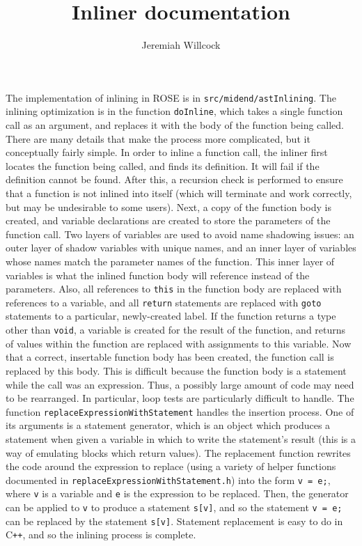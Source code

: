 \documentclass{article}
\begin{document}
\author{Jeremiah Willcock}
\title{Inliner documentation}
\maketitle

\lstset{language=C++}
\newcommand{\Cpp}{C\texttt{++}}

The implementation of inlining in ROSE is in
\texttt{src/midend/astInlining}.  The inlining optimization is in the
function \lstinline{doInline}, which takes a single function call as an
argument, and replaces it with the body of the function being called.
There are many details that make the process more complicated, but it
conceptually fairly simple.  In order to inline a function call, the
inliner first locates the function being called, and finds its definition.
It will fail if the definition cannot be found.  After this, a recursion
check is performed to ensure that a function is not inlined into itself
(which will terminate and work correctly, but may be undesirable to some
users).  Next, a copy of the function body is created, and variable
declarations are created to store the parameters of the function call.  Two
layers of variables are used to avoid name shadowing issues: an outer layer
of shadow variables with unique names, and an inner layer of variables
whose names match the parameter names of the function.  This inner layer of
variables is what the inlined function body will reference instead of the
parameters.  Also, all references to \lstinline{this} in the function body
are replaced with references to a variable, and all \lstinline{return}
statements are replaced with \lstinline{goto} statements to a particular,
newly-created label.  If the function returns a type other than
\lstinline{void}, a variable is created for the result of the function, and
returns of values within the function are replaced with assignments to this
variable.  Now that a correct, insertable function body has been created,
the function call is replaced by this body.  This is difficult because the
function body is a statement while the call was an expression.  Thus, a
possibly large amount of code may need to be rearranged.  In particular,
loop tests are particularly difficult to handle.  The function
\lstinline{replaceExpressionWithStatement} handles the insertion process.
One of its arguments is a statement generator, which is an object which
produces a statement when given a variable in which to write the
statement's result (this is a way of emulating blocks which return values).
The replacement function rewrites the code around the expression to replace
(using a variety of helper functions documented in
\texttt{replaceExpressionWithStatement.h}) into the form \lstinline{v = e;},
where \lstinline{v} is a variable and \lstinline{e} is the expression
to be replaced.  Then, the generator can be applied to \lstinline{v} to
produce a statement \lstinline{s[v]}, and so the statement \lstinline{v = e;}
can be replaced by the statement \lstinline{s[v]}.  Statement
replacement is easy to do in \Cpp{}, and so the inlining process is
complete.
\end{document}

